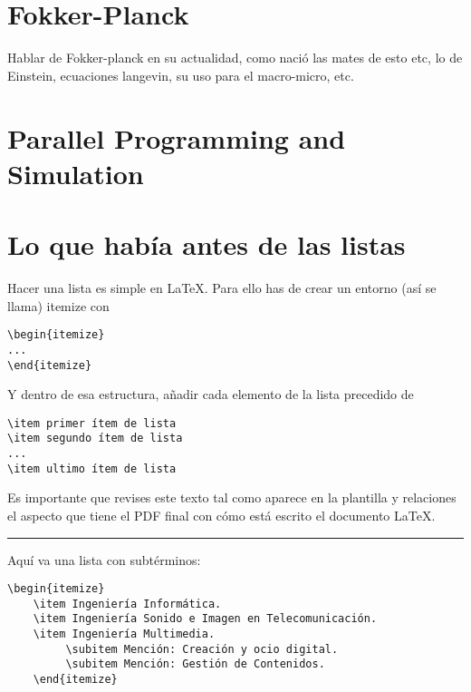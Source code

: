 \section{Fokker-Planck}
Hablar de Fokker-planck en su actualidad, como nació las mates de esto etc, lo de Einstein, ecuaciones langevin, su uso para el macro-micro, etc.

\section{Parallel Programming and Simulation}

\section{Lo que había antes de las listas}

Hacer una lista es simple en \LaTeX. Para ello has de crear un entorno (así se llama) itemize con
\begin{lstlisting}[style=Latex-color]
\begin{itemize}
...
\end{itemize}
\end{lstlisting}
Y dentro de esa estructura, añadir cada elemento de la lista precedido de 
\begin{lstlisting}[style=Latex-color]
\item primer ítem de lista
\item segundo ítem de lista
...
\item ultimo ítem de lista
\end{lstlisting}

Es importante que revises este texto tal como aparece en la plantilla y relaciones el aspecto que tiene el PDF final con cómo está escrito el documento \LaTeX.
\vspace{1em}
\noindent\hrule
\vspace{1em}

Aquí va una lista con subtérminos:
\begin{lstlisting}[style=Latex-color]
	\begin{itemize}
    \item Ingeniería Informática.
    \item Ingeniería Sonido e Imagen en Telecomunicación.
    \item Ingeniería Multimedia.
         \subitem Mención: Creación y ocio digital.
         \subitem Mención: Gestión de Contenidos.
	\end{itemize}
\end{lstlisting}

